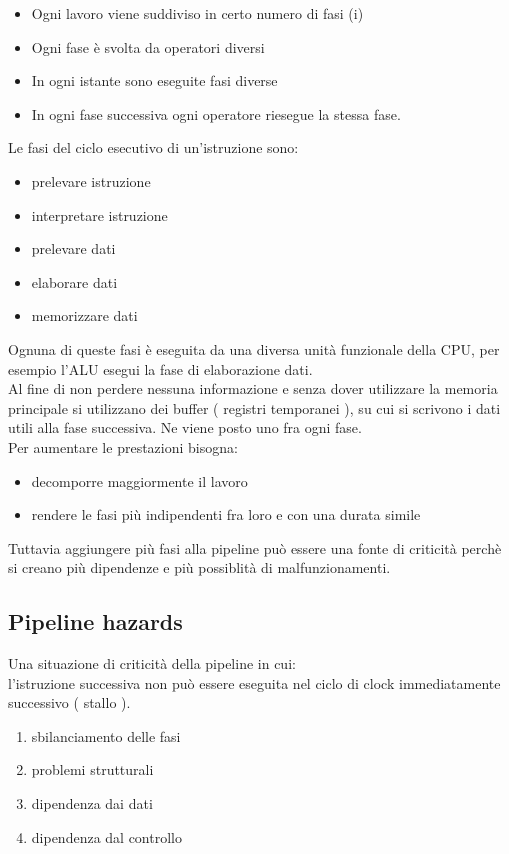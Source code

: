 \documentclass[arch.tex]{subfiles}
\begin{document}
\begin{itemize}
	\item Ogni lavoro viene suddiviso in certo numero di fasi (i)
	\item Ogni fase è svolta da operatori diversi
	\item In ogni istante sono eseguite fasi diverse
	\item In ogni fase successiva ogni operatore riesegue la stessa fase.
\end{itemize}
Le fasi del ciclo esecutivo di un'istruzione sono:

\begin{itemize}
	\item prelevare istruzione
	\item interpretare istruzione
	\item prelevare dati
	\item elaborare dati
	\item memorizzare dati
\end{itemize}
Ognuna di queste fasi è eseguita da una diversa unità funzionale della CPU,
per esempio l'ALU esegui la fase di elaborazione dati.\\
Al fine di non perdere nessuna informazione e senza dover utilizzare la memoria 
principale si utilizzano dei buffer ( registri temporanei ), su cui si scrivono 
i dati utili alla fase successiva. Ne viene posto uno fra ogni fase.\\
Per aumentare le prestazioni bisogna:

\begin{itemize}
	\item decomporre maggiormente il lavoro
	\item rendere le fasi più indipendenti fra loro e con
		una durata simile
\end{itemize}
Tuttavia aggiungere più fasi alla pipeline può essere una fonte di criticità 
perchè si creano più dipendenze e più possiblità di malfunzionamenti.

\subsection{Pipeline hazards}%
\label{sub:pipeline_hazards}

Una situazione di criticità della pipeline in cui:\\
l'istruzione successiva non può essere eseguita nel ciclo di clock 
immediatamente successivo ( stallo ).

\begin{enumerate}
	\item sbilanciamento delle fasi
	\item problemi strutturali
	\item dipendenza dai dati
	\item dipendenza dal controllo
\end{enumerate}
\end{document}
